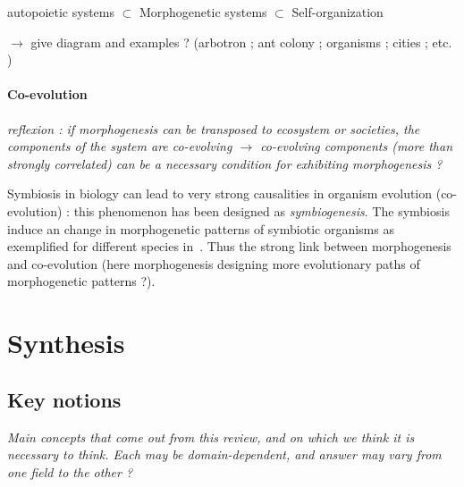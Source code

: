 \documentclass{article}
\begin{document}
autopoietic systems $\subset$ Morphogenetic systems $\subset$ Self-organization

$\rightarrow$ give diagram and examples ? (arbotron ; ant colony ; organisms ; cities ; etc. )

\paragraph{Co-evolution}

\textit{reflexion : if morphogenesis can be transposed to ecosystem or societies, the components of the system are co-evolving $\rightarrow$ co-evolving components (more than strongly correlated) can be a necessary condition for exhibiting morphogenesis ?}

Symbiosis in biology can lead to very strong causalities in organism evolution (co-evolution) : this phenomenon has been designed as \emph{symbiogenesis}. The symbiosis induce an change in morphogenetic patterns of symbiotic organisms as exemplified for different species in~\cite{chapman1998morphogenesis}. Thus the strong link between morphogenesis and co-evolution (here morphogenesis designing more evolutionary paths of morphogenetic patterns ?).



\section{Synthesis}

\subsection{Key notions}

\textit{Main concepts that come out from this review, and on which we think it is necessary to think. Each may be domain-dependent, and answer may vary from one field to the other ?}
\end{document}
